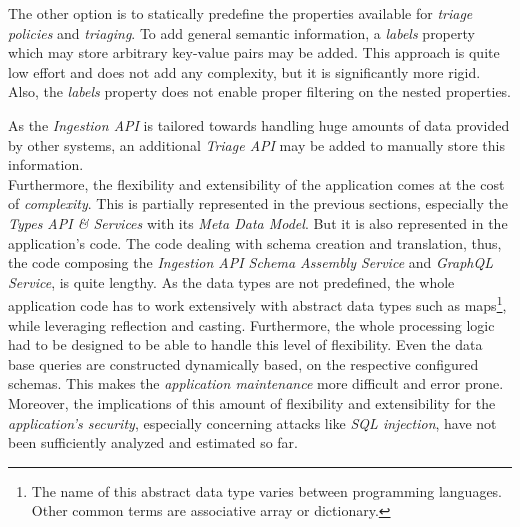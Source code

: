 The other option is to statically predefine the properties available for \emph{triage policies} and \emph{triaging}. To add general semantic information, a \emph{labels} property which may store arbitrary key-value pairs may be added. This approach is quite low effort and does not add any complexity, but it is significantly more rigid. Also, the \emph{labels} property does not enable proper filtering on the nested properties.\par
As the \emph{Ingestion API} is tailored towards handling huge amounts of data provided by other systems, an additional \emph{Triage API} may be added to manually store this information.\\

Furthermore, the flexibility and extensibility of the application comes at the cost of \emph{complexity}. This is partially represented in the previous sections, especially the \emph{Types API \& Services} with its \emph{Meta Data Model}. But it is also represented in the application's code. The code dealing with schema creation and translation, thus, the code composing the \emph{Ingestion API Schema Assembly Service} and \emph{GraphQL Service}, is quite lengthy. As the data types are not predefined, the whole application code has to work extensively with abstract data types such as maps\footnote{The name of this abstract data type varies between programming languages. Other common terms are associative array or dictionary.}, while leveraging reflection and casting. Furthermore, the whole processing logic had to be designed to be able to handle this level of flexibility. Even the data base queries are constructed dynamically based, on the respective configured schemas. This makes the \emph{application maintenance} more difficult and error prone. Moreover, the implications of this amount of flexibility and extensibility for the \emph{application's security}, especially concerning attacks like \emph{SQL injection}, have not been sufficiently analyzed and estimated so far. 
